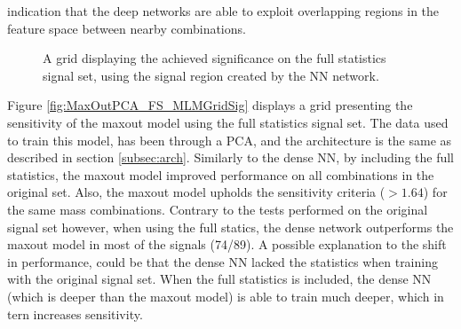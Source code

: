 indication that the deep networks are able to exploit overlapping regions in the feature space between nearby combinations.\\
\begin{figure}
    \caption{A grid displaying the achieved significance on the full statistics signal set, using the signal region 
    created by the \ac{NN} network.}
    \label{fig:NN_FS_MLMGridSig}
\end{figure}
Figure \ref{fig:MaxOutPCA_FS_MLMGridSig} displays a grid presenting the sensitivity of the maxout model using the full statistics 
signal set. The data used to train this model, has been through a \ac{PCA}, and the architecture is the same as described in section \ref{subsec:arch}.
Similarly to the dense \ac{NN}, by including the full statistics, the maxout model improved performance on all combinations in the original set. 
Also, the maxout model upholds the sensitivity criteria ($>1.64$) for the same mass combinations. 
Contrary to the tests performed on the original signal set however, when using the full statics, the dense network 
outperforms the maxout model in most of the signals (74/89). A possible explanation to the shift in performance, could 
be that the dense \ac{NN} lacked the statistics when training with the original signal set. When the full statistics is included,
the dense \ac{NN} (which is deeper than the maxout model) is able to train much deeper, which in tern increases sensitivity. 
